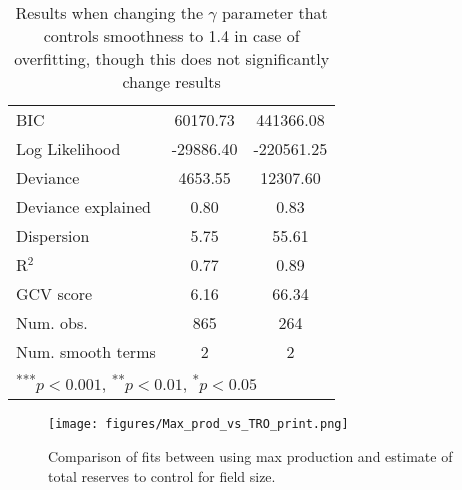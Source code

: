 \documentclass[12pt]{article}
\begin{document}
\begin{table}
\begin{center}
\begin{tabular}{l c c }
BIC                                  & 60170.73      & 441366.08     \\
Log Likelihood                       & -29886.40     & -220561.25    \\
Deviance                             & 4653.55       & 12307.60      \\
Deviance explained                   & 0.80          & 0.83          \\
Dispersion                           & 5.75          & 55.61         \\
R$^2$                                & 0.77          & 0.89          \\
GCV score                            & 6.16          & 66.34         \\
Num. obs.                            & 865           & 264           \\
Num. smooth terms                    & 2             & 2             \\
\hline
\multicolumn{3}{l}{\scriptsize{\textsuperscript{***}$p<0.001$, 
  \textsuperscript{**}$p<0.01$, 
  \textsuperscript{*}$p<0.05$}}
\end{tabular}
\caption{Results when changing the $\gamma$ parameter that controls smoothness to 1.4 in case of overfitting, though this does not significantly change results}
\label{table:gamma_check}
\end{center}
\end{table}

\begin{figure}
	\texttt{[image: figures/Max\_prod\_vs\_TRO\_print.png]}
	\caption{Comparison of fits between using max production and estimate of total reserves to control for field size.}
	\label{chart:Max_prod_vs_TRO_print}
\end{figure}
\end{document}
